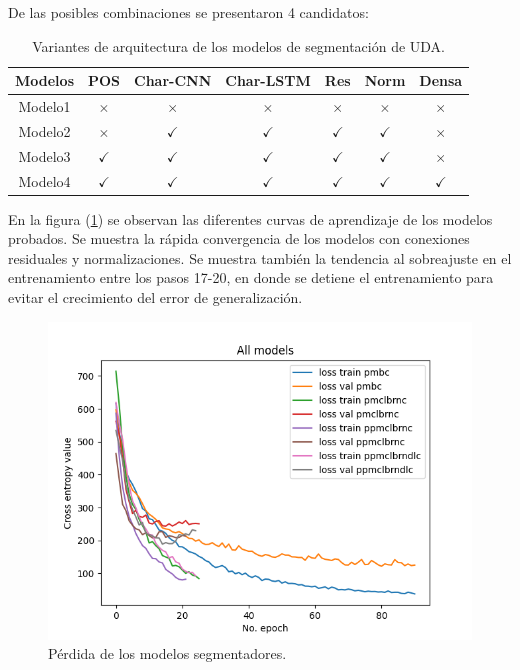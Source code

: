 De las posibles combinaciones se presentaron 4 candidatos:

\begin{table}[h!]
	\begin{center}
		\begin{tabular}{|c|c|c|c|c|c|c|} \hline
		Modelos 	& POS       & Char-CNN  & Char-LSTM & Res       & Norm      & Densa  \\ \hline
		Modelo1		& $\times$	& $\times$    & $\times$    & $\times$	& $\times$    & $\times$ \\ \hline
		Modelo2		& $\times$	& $\checkmark$    & $\checkmark$    & $\checkmark$	& $\checkmark$    & $\times$ \\ \hline
		Modelo3		& $\checkmark$	& $\checkmark$    & $\checkmark$    & $\checkmark$	& $\checkmark$    & $\times$ \\ \hline
		Modelo4		& $\checkmark$	& $\checkmark$    & $\checkmark$    & $\checkmark$	& $\checkmark$    & $\checkmark$ \\ \hline
		\end{tabular}
	\caption{Variantes de arquitectura de los modelos de segmentación de UDA.}\label{fig:segmenter_architecture_table}
	\end{center}
\end{table}

En la figura (\ref{fig:segmenter_model_loss}) se observan las diferentes curvas de aprendizaje de los modelos 
probados. Se muestra la rápida convergencia de los modelos con conexiones residuales y normalizaciones.
Se muestra también la tendencia al sobreajuste en el entrenamiento entre los pasos 17-20, en donde se detiene el 
entrenamiento para evitar el crecimiento del error de generalización.

\begin{figure}[h!]
	\begin{center}
		\begin{center}
			\includegraphics[scale=.9]{Graphics/persuasive_essays_all_linked_crf_loss.png}
        \end{center}
	    \caption{Pérdida de los modelos segmentadores.}\label{fig:segmenter_model_loss}
	\end{center}
\end{figure}

